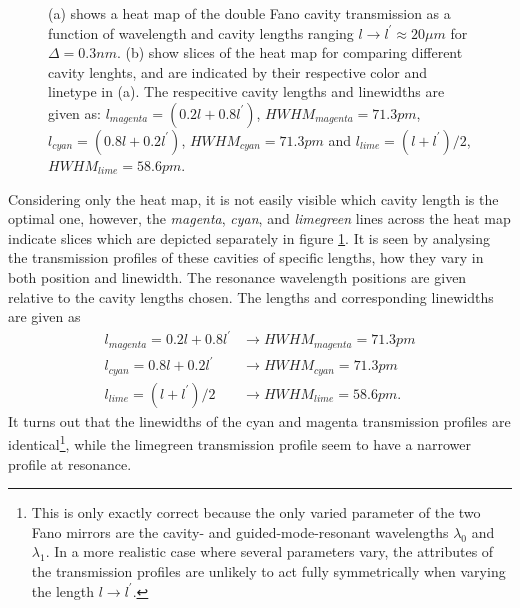 \begin{figure}[h!]
\begin{subfigure}[c]{0.49\textwidth}
        \caption{}
        \label{fig:cmap_slices}
    \end{subfigure}
    \caption{(a) shows a heat map of the double Fano cavity transmission as a function of wavelength and cavity lengths ranging $l \rightarrow l^{\prime} \approx 20 \mu m$ for $\Delta = 0.3nm$. (b) show slices of the heat map for comparing different cavity lenghts, and are indicated by their respective color and linetype in (a). The respecitive cavity lengths and linewidths are given as: $l_{magenta} = (0.2l+0.8l^{\prime})$, $HWHM_{magenta} = 71.3pm$, $l_{cyan} = (0.8l+0.2l^{\prime})$, $HWHM_{cyan} = 71.3pm$ and $l_{lime} = (l+l^{\prime})/2$, $HWHM_{lime} = 58.6pm$.}
    \label{fig:cmap_and_slices}
\end{figure}

Considering only the heat map, it is not easily visible which cavity length is the optimal one, however, the \emph{magenta}, \emph{cyan}, and \emph{limegreen} lines across the heat map indicate slices which are depicted separately in figure \ref{fig:cmap_slices}. It is seen by analysing the transmission profiles of these cavities of specific lengths, how they vary in both position and linewidth. The resonance wavelength positions are given relative to the cavity lengths chosen. The lengths and corresponding linewidths are given as
\begin{equation}
    \begin{split}
        l_{magenta} = 0.2 l + 0.8 l^{\prime} &\rightarrow HWHM_{magenta} = 71.3pm\\ l_{cyan} = 0.8 l + 0.2 l^{\prime} &\rightarrow HWHM_{cyan} = 71.3pm\\ l_{lime} = (l + l^{\prime})/2 &\rightarrow HWHM_{lime} = 58.6pm.
    \end{split}
\end{equation}
It turns out that the linewidths of the cyan and magenta transmission profiles are identical\footnote{This is only exactly correct because the only varied parameter of the two Fano mirrors are the cavity- and guided-mode-resonant wavelengths $\lambda_0$ and $\lambda_1$. In a more realistic case where several parameters vary, the attributes of the transmission profiles are unlikely to act fully symmetrically when varying the length $l \rightarrow l^{\prime}$.}, while the limegreen transmission profile seem to have a narrower profile at resonance. 

